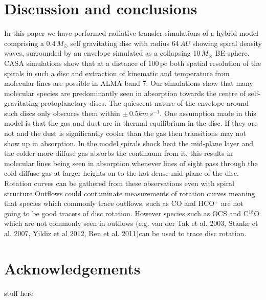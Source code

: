 \documentclass[useAMS,usenatbib]{mn2e}
\begin{document}
\section{Discussion and conclusions} \label{sec:discussion}

In this paper we have performed radiative transfer simulations of a hybrid model comprising a 0.4$\, M_\odot$ self gravitating disc with radius 64$\,AU$ showing spiral density waves, surrounded by an envelope simulated as a collapsing 10$\,M_\odot$ BE-sphere. CASA simulations show that at a distance of 100$\,$pc both spatial resolution of the spirals in such a disc and extraction of kinematic and temperature from molecular lines are possible in ALMA band 7. Our simulations show that many  molecular species are predominantly seen in absorption towards the centre of  self-gravitating protoplanetary discs. The quiescent nature of the envelope around such discs only obscures them within $\pm\,0.5 km\,s^{-1}$.\newline
One assumption made in this model is that the gas and dust are in thermal equilibrium in the disc. If they are not and the dust is significantly cooler than the gas then transitions may not show up in absorption.\newline
In the model spirals shock heat the mid-plane layer and the colder more diffuse gas absorbs the continuum from it, this results in molecular lines being seen in absorption whenever lines of sight pass through the cold diffuse gas at larger heights on to the hot dense mid-plane of the disc. Rotation curves can be gathered from these observations even with spiral structure\newline
Outflows could contaminate measurements of rotation curves meaning that species  which commonly trace outflows, such as CO and HCO$^+$ are not going to be good tracers of disc rotation. However species such as OCS and C$^{18}$O which are not commonly seen in outflows (e.g. van der Tak et al. 2003, Stanke et al. 2007, Yildiz et al 2012, Ren et al. 2011)can be used to trace disc rotation.


\section*{Acknowledgements}

stuff here
\newpage
\end{document}
